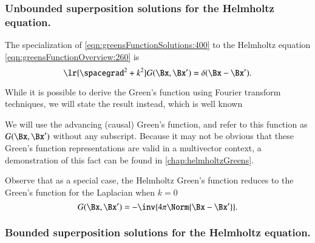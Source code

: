 %
%
\subsubsection{Unbounded superposition solutions for the Helmholtz equation.}

The specialization of \cref{eqn:greensFunctionSolutions:400} to the Helmholtz equation \cref{eqn:greensFunctionOverview:260} is
\begin{dmath}\label{eqn:greensFunctionHelmholtz:420}
\lr{ \spacegrad^2 + k^2 } G(\Bx, \Bx') = \delta(\Bx - \Bx').
\end{dmath}

While it is possible \citep{schwinger1998classical} to derive the Green's function using Fourier transform techniques, we will state the result instead, which is well known



We will use the advancing (causal) Green's function, and refer to this function as \( G(\Bx, \Bx') \) without any subscript.
Because it may not be obvious that these
Green's function representations are valid in a multivector context, a demonstration of this fact can be found in \cref{chap:helmholtzGreens}.

Observe that as a special case, the Helmholtz Green's function reduces to the Green's function for the Laplacian when \( k = 0 \)
\begin{dmath}\label{eqn:greensFunctionHelmholtz:80}
G(\Bx, \Bx') = -\inv{ 4 \pi \Norm{\Bx - \Bx'}}.
\end{dmath}

\subsubsection{Bounded superposition solutions for the Helmholtz equation.}

